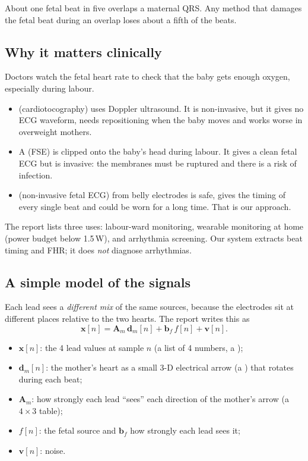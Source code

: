 \documentclass[11pt]{article}
\begin{document}
\begin{keyfact}
About one fetal beat in five overlaps a maternal QRS. Any method that damages the fetal beat during an overlap loses about a fifth of the beats.
\end{keyfact}

\subsection{Why it matters clinically}
Doctors watch the fetal heart rate to check that the baby gets enough oxygen, especially during labour.
\begin{itemize}
  \item {} (cardiotocography) uses Doppler ultrasound. It is non-invasive, but it gives no ECG waveform, needs repositioning when the baby moves and works worse in overweight mothers.
  \item A  (FSE) is clipped onto the baby's head during labour. It gives a clean fetal ECG but is invasive: the membranes must be ruptured and there is a risk of infection.
  \item {} (non-invasive fetal ECG) from belly electrodes is safe, gives the timing of every single beat and could be worn for a long time. That is our approach.
\end{itemize}
The report lists three uses: labour-ward monitoring, wearable monitoring at home (power budget below 1.5\,W), and arrhythmia screening. Our system extracts beat timing and FHR; it does \emph{not} diagnose arrhythmias.

\subsection{A simple model of the signals}
Each lead sees a \emph{different mix} of the same sources, because the electrodes sit at different places relative to the two hearts. The report writes this as
\[
\mathbf{x}[n] = \mathbf{A}_m\,\mathbf{d}_m[n] + \mathbf{b}_f\,f[n] + \mathbf{v}[n].
\]
\begin{itemize}
  \item $\mathbf{x}[n]$: the 4 lead values at sample $n$ (a list of 4 numbers, a );
  \item $\mathbf{d}_m[n]$: the mother's heart as a small 3-D electrical arrow (a ) that rotates during each beat;
  \item $\mathbf{A}_m$: how strongly each lead ``sees'' each direction of the mother's arrow (a $4\times3$ table);
  \item $f[n]$: the fetal source and $\mathbf{b}_f$ how strongly each lead sees it;
  \item $\mathbf{v}[n]$: noise.
\end{itemize}
\end{document}
